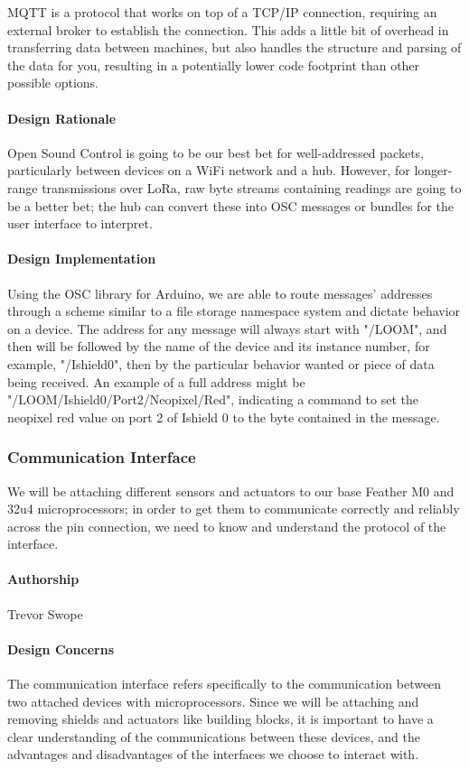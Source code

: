\documentclass[onecolumn, draftclsnofoot,10pt, compsoc]{IEEEtran}
\begin{document}
    MQTT \cite{MQTT} is a protocol that works on top of a TCP/IP connection, requiring an external broker to establish the connection. This adds a little bit of overhead in transferring data between machines, but also handles the structure and parsing of the data for you, resulting in a potentially lower code footprint than other possible options. 

\paragraph{Design Rationale}
    Open Sound Control is going to be our best bet for well-addressed packets, particularly between devices on a WiFi network and a hub. However, for longer-range transmissions over LoRa, raw byte streams containing readings are going to be a better bet; the hub can convert these into OSC messages or bundles for the user interface to interpret. 

\paragraph{Design Implementation}
    Using the OSC library for Arduino, we are able to route messages' addresses through a scheme similar to a file storage namespace system and dictate behavior on a device. The address for any message will always start with "/LOOM", and then will be followed by the name of the device and its instance number, for example, "/Ishield0", then by the particular behavior wanted or piece of data being received. An example of a full address might be "/LOOM/Ishield0/Port2/Neopixel/Red", indicating a command to set the neopixel red value on port 2 of Ishield 0 to the byte contained in the message. 


\subsubsection{Communication Interface}
    We will be attaching different sensors and actuators to our base Feather M0 and 32u4 microprocessors; in order to get them to communicate correctly and reliably across the pin connection, we need to know and understand the protocol of the interface. 

\paragraph{Authorship}
    Trevor Swope

\paragraph{Design Concerns}
    The communication interface refers specifically to the communication between two attached devices with microprocessors. Since we will be attaching and removing shields and actuators like building blocks, it is important to have a clear understanding of the communications between these devices, and the advantages and disadvantages of the interfaces we choose to interact with.
\end{document}
